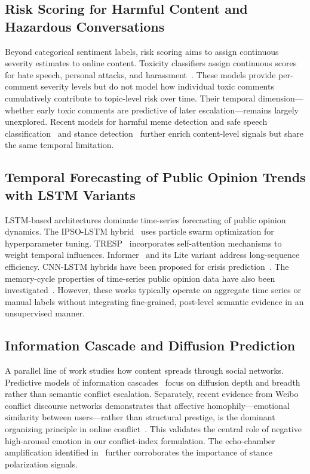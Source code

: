 \documentclass[11pt,a4paper]{article}
\begin{document}
\subsection{Risk Scoring for Harmful Content and Hazardous Conversations}

Beyond categorical sentiment labels, risk scoring aims to assign continuous severity estimates to online content. Toxicity classifiers assign continuous scores for hate speech, personal attacks, and harassment~\cite{Wulczyn2017}. These models provide per-comment severity levels but do not model how individual toxic comments cumulatively contribute to topic-level risk over time. Their temporal dimension---whether early toxic comments are predictive of later escalation---remains largely unexplored. Recent models for harmful meme detection and safe speech classification~\cite{ghosh2024safespeech} and stance detection~\cite{kucuk2020stance,paschalides2025polar} further enrich content-level signals but share the same temporal limitation.

\subsection{Temporal Forecasting of Public Opinion Trends with LSTM Variants}

LSTM-based architectures dominate time-series forecasting of public opinion dynamics. The IPSO-LSTM hybrid~\cite{Mu2023IPSO} uses particle swarm optimization for hyperparameter tuning. TRESP~\cite{Zhang2024TRESP} incorporates self-attention mechanisms to weight temporal influences. Informer~\cite{zhou2021informer} and its Lite variant address long-sequence efficiency. CNN-LSTM hybrids have been proposed for crisis prediction~\cite{lou2024cnnlstm,singh2025cupcdlstm,upadhyay2024satcobilstm}. The memory-cycle properties of time-series public opinion data have also been investigated~\cite{liu2025memory}. However, these works typically operate on aggregate time series or manual labels without integrating fine-grained, post-level semantic evidence in an unsupervised manner.

\subsection{Information Cascade and Diffusion Prediction}

A parallel line of work studies how content spreads through social networks. Predictive models of information cascades~\cite{xu2025d2,xu2025hyperidp} focus on diffusion depth and breadth rather than semantic conflict escalation. Separately, recent evidence from Weibo conflict discourse networks demonstrates that affective homophily---emotional similarity between users---rather than structural prestige, is the dominant organizing principle in online conflict~\cite{gu2025affective}. This validates the central role of negative high-arousal emotion in our conflict-index formulation. The echo-chamber amplification identified in~\cite{ghafouri2024echo} further corroborates the importance of stance polarization signals.
\end{document}
